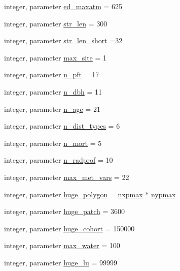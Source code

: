 \begin{DoxyCompactItemize}
\item 
integer, parameter \hyperlink{namespaceed__max__dims_a9546595c14761003135ceaea096141e0}{ed\+\_\+maxatm} = 625
\item 
integer, parameter \hyperlink{namespaceed__max__dims_a2d9d6df2bb657ed6455ccdf411863dd9}{str\+\_\+len} = 300
\item 
integer, parameter \hyperlink{namespaceed__max__dims_aa0b83676744833979e6ea1e266859852}{str\+\_\+len\+\_\+short} =32
\item 
integer, parameter \hyperlink{namespaceed__max__dims_a4f9df14847da037dc8ff6f9c85086a62}{max\+\_\+site} = 1
\item 
integer, parameter \hyperlink{namespaceed__max__dims_ade9d322dcecc058458fce6b2093d5890}{n\+\_\+pft} = 17
\item 
integer, parameter \hyperlink{namespaceed__max__dims_a380455bae103b42e1281c4398372a696}{n\+\_\+dbh} = 11
\item 
integer, parameter \hyperlink{namespaceed__max__dims_a84ccb51c1637971b5b4b87c83b2b24ae}{n\+\_\+age} = 21
\item 
integer, parameter \hyperlink{namespaceed__max__dims_a7a8205408259fcb297b0cb04f549fe44}{n\+\_\+dist\+\_\+types} = 6
\item 
integer, parameter \hyperlink{namespaceed__max__dims_a8e6b880e0c740346e2450c60e80b8a09}{n\+\_\+mort} = 5
\item 
integer, parameter \hyperlink{namespaceed__max__dims_a33cf3454a80e938f8951d733d40b53d7}{n\+\_\+radprof} = 10
\item 
integer, parameter \hyperlink{namespaceed__max__dims_ad51de8cc1effd1c544a3987c0a6f4390}{max\+\_\+met\+\_\+vars} = 22
\item 
integer, parameter \hyperlink{namespaceed__max__dims_ab29e324be8290f305576594fd41c905a}{huge\+\_\+polygon} = \hyperlink{namespaceed__max__dims_a916d08772a2cdff90b033432f7c043dd}{nxpmax} $\ast$ \hyperlink{namespaceed__max__dims_a70351cc508b47a5bfa506ba83bf41523}{nypmax}
\item 
integer, parameter \hyperlink{namespaceed__max__dims_a968dc04fd98ac746c6750e3540d49535}{huge\+\_\+patch} = 3600
\item 
integer, parameter \hyperlink{namespaceed__max__dims_a156b1cc088e31e7dc095c2cf33f775a0}{huge\+\_\+cohort} = 150000
\item 
integer, parameter \hyperlink{namespaceed__max__dims_a840d831a08084a2e9f939e28ef803b9a}{max\+\_\+water} = 100
\item 
integer, parameter \hyperlink{namespaceed__max__dims_a02ea3f49de6c06d652845010cf25c58b}{huge\+\_\+lu} = 99999

\end{DoxyCompactItemize}
